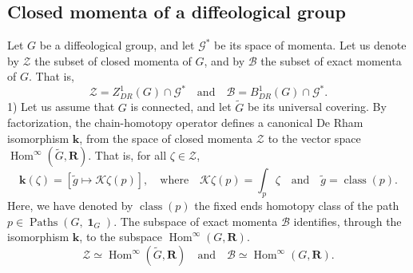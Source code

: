 \documentclass[10pt,reqno,twoside]{amsart}
\newcommand{\qmbox}[1]{\quad\mbox{#1}\quad}
\newcommand{\RR}{\mathbf{R}}
\newcommand{\cB}{\mathcal{B}}
\newcommand{\cG}{\mathcal{G}}
\newcommand{\cK}{\mathcal{K}}
\newcommand{\cZ}{\mathcal{Z}}
\DeclareMathOperator{\id}{\mathbf{1}}
\DeclareMathOperator{\Hom}{Hom}
\DeclareMathOperator{\Paths}{Paths}
\DeclareMathOperator{\class}{class}
\newcommand{\ek}{\mathbf{k}}
\newcommand{\R}{R}
\newcommand{\D}{D}
\newcommand{\B}{B}
\newcommand{\Z}{Z}
\theoremstyle{plain}
\theoremstyle{definition}
\newcommand{\article}[1]{\subsection{#1}}
\begin{document}
  \article{Closed momenta of a diffeological group}
  \label{Closed-momenta-of-a-diffeological-group}
  Let $G$ be a diffeological group,
  and let $\cG^*$ be its space of momenta.
  Let us denote by $\cZ$ the subset of closed momenta of $G$,
  and by $\cB$ the subset of exact momenta of $G$.
  That is,
  $$
    \cZ = \Z^1_{\D\R}(G) \cap \cG^* \qmbox{and} \cB = \B^1_{\D\R}(G) \cap \cG^*.
    $$
  1) Let us assume that $G$ is connected,
  and let $\tilde G$ be its universal covering.
  By factorization,
  the chain-homotopy operator defines a canonical De Rham isomorphism $\ek$,
  from the space of closed momenta $\cZ$ to the vector space $\Hom^\infty(\tilde G,\RR)$.
  That is,
  for all $\zeta \in \cZ$,
  $$
    \ek(\zeta) = [\tilde g \mapsto \cK\zeta(p)], \qmbox{where}
    \cK\zeta(p) = \int_{p} \zeta
    \qmbox{and} \tilde g = \class(p).
    $$
  Here,
  we have denoted by $\class(p)$ the fixed ends homotopy class of the path $p \in \Paths(G,\id_G)$.
  The subspace of exact momenta $\cB$ identifies,
  through the isomorphism $\ek$,
  to the subspace $\Hom^\infty(G,\RR)$.
  $$
    \cZ \simeq \Hom^\infty(\tilde G,\RR)
    \qmbox{and}
    \cB \simeq \Hom^\infty(G,\RR).
    $$
  
\end{document}
